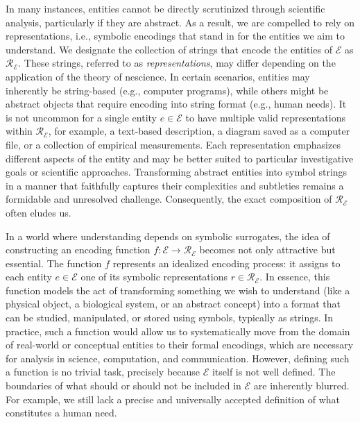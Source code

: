 In many instances, entities cannot be directly scrutinized through scientific analysis, particularly if they are abstract. As a result, we are compelled to rely on representations, i.e., symbolic encodings that stand in for the entities we aim to understand. We designate the collection of strings that encode the entities of $\mathcal{E}$ as $\mathcal{R_\mathcal{E}}$. These strings, referred to as \emph{representations}, may differ depending on the application of the theory of nescience. In certain scenarios, entities may inherently be string-based (e.g., computer programs), while others might be abstract objects that require encoding into string format (e.g., human needs). It is not uncommon for a single entity $e \in \mathcal{E}$ to have multiple valid representations within $\mathcal{R_\mathcal{E}}$, for example, a text-based description, a diagram saved as a computer file, or a collection of empirical measurements. Each representation emphasizes different aspects of the entity and may be better suited to particular investigative goals or scientific approaches. Transforming abstract entities into symbol strings in a manner that faithfully captures their complexities and subtleties remains a formidable and unresolved challenge. Consequently, the exact composition of $\mathcal{R_\mathcal{E}}$ often eludes us.

In a world where understanding depends on symbolic surrogates, the idea of constructing an encoding function $f:\mathcal{E} \rightarrow \mathcal{R_\mathcal{E}}$ becomes not only attractive but essential. The function $f$ represents an idealized encoding process: it assigns to each entity $e \in \mathcal{E}$ one of its symbolic representations $r \in \mathcal{R_\mathcal{E}}$. In essence, this function models the act of transforming something we wish to understand (like a physical object, a biological system, or an abstract concept) into a format that can be studied, manipulated, or stored using symbols, typically as strings. In practice, such a function would allow us to systematically move from the domain of real-world or conceptual entities to their formal encodings, which are necessary for analysis in science, computation, and communication. However, defining such a function is no trivial task, precisely because $\mathcal{E}$ itself is not well defined. The boundaries of what should or should not be included in $\mathcal{E}$ are inherently blurred. For example, we still lack a precise and universally accepted definition of what constitutes a human need.


